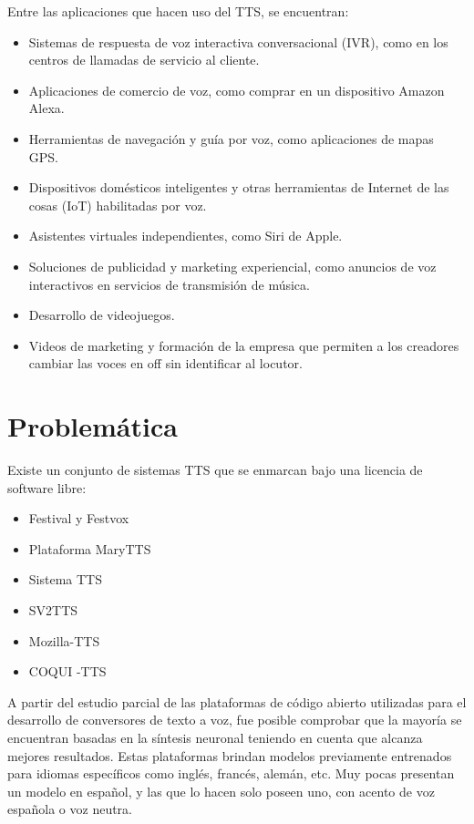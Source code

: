 Entre las aplicaciones que hacen uso del TTS, se encuentran:

\begin{itemize}
	\item Sistemas de respuesta de voz interactiva conversacional (IVR), como en los centros de llamadas de servicio al cliente.
	
	\item Aplicaciones de comercio de voz, como comprar en un dispositivo Amazon Alexa.
	\item Herramientas de navegación y guía por voz, como aplicaciones de mapas GPS.
	\item Dispositivos domésticos inteligentes y otras herramientas de Internet de las cosas (IoT) habilitadas por voz.
	\item Asistentes virtuales independientes, como Siri de Apple.
	\item Soluciones de publicidad y marketing experiencial, como anuncios de voz interactivos en servicios de transmisión de música.
	\item Desarrollo de videojuegos.
	\item Videos de marketing y formación de la empresa que permiten a los creadores cambiar las	voces en off sin identificar al locutor.
\end{itemize}

\section*{Problemática}
Existe un conjunto de sistemas TTS que se enmarcan bajo una licencia de software libre:
\begin{itemize}
	\item Festival y Festvox
	\item Plataforma MaryTTS
	\item Sistema TTS
	\item SV2TTS
	\item Mozilla-TTS
	\item COQUI -TTS
\end{itemize}


A partir del estudio parcial de las plataformas de código abierto utilizadas para el desarrollo de conversores de texto a voz, fue posible comprobar que la mayoría se encuentran basadas en la síntesis neuronal teniendo en cuenta que alcanza mejores resultados. Estas plataformas brindan modelos previamente entrenados para idiomas específicos como inglés, francés, alemán, etc. Muy pocas presentan un modelo en español, y las que lo hacen solo poseen uno, con acento de voz española o voz neutra.\\

